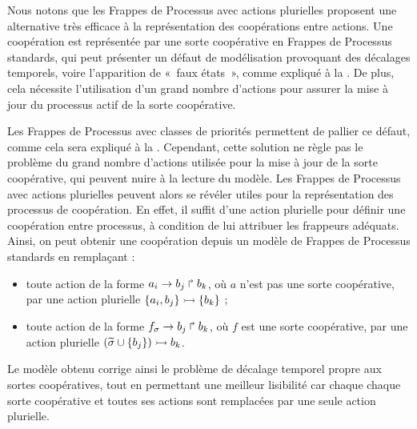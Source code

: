 Nous notons que les Frappes de Processus avec actions plurielles proposent une alternative
très efficace à la représentation des coopérations entre actions.
Une coopération est représentée par une sorte coopérative en Frappes de Processus
standards,
qui peut présenter un défaut de modélisation provoquant des décalages
temporels, voire l'apparition de «~faux états~»,
comme expliqué à la .
De plus, cela nécessite l'utilisation d'un grand nombre d'actions pour assurer la mise à jour
du processus actif de la sorte coopérative.

\label{ph2phm}
Les Frappes de Processus avec classes de priorités permettent de pallier ce défaut,
comme cela sera expliqué à la .
Cependant, cette solution ne règle pas le problème du grand nombre d'actions
utilisée pour la mise à jour de la sorte coopérative,
qui peuvent nuire à la lecture du modèle.
Les Frappes de Processus avec actions plurielles peuvent alors se révéler utiles
pour la représentation des processus de coopération.
En effet, il suffit d'une action plurielle pour définir une coopération entre processus,
à condition de lui attribuer les frappeurs adéquats.
Ainsi, on peut obtenir une coopération depuis un modèle de Frappes de Processus standards
en remplaçant :
\begin{itemize}
  \item toute action de la forme $a_i\rightarrow b_j\Rsh b_k$,
    où $a$ n'est pas une sorte coopérative, par
    une action plurielle $\mbox{$\{a_i, b_j\} \rightarrowtail \{b_k\}$}$ ;
  \item toute action de la forme $f_{\sigma}\rightarrow b_j\Rsh b_k$,
    où $f$ est une sorte coopérative, par
    une action plurielle $\mbox{$(\widetilde{\sigma} \cup \{ b_j \}) \rightarrowtail b_k$}$.
\end{itemize}
Le modèle obtenu corrige ainsi le problème de décalage temporel propre aux sortes
coopératives, tout en permettant une meilleur lisibilité
car chaque chaque sorte coopérative et toutes ses actions sont remplacées par
une seule action plurielle.

